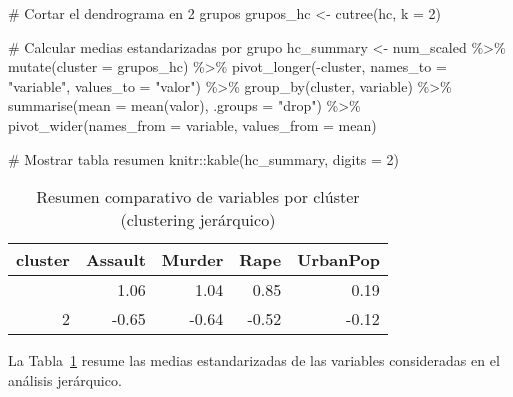 \documentclass[
  spanish,
  11pt,
  a4paper,
  DIV=11,
  numbers=noendperiod]{scrartcl}
\newenvironment{Shaded}{\begin{snugshade}}{\end{snugshade}}
\newcommand{\AttributeTok}[1]{\textcolor[rgb]{0.40,0.45,0.13}{#1}}
\newcommand{\CommentTok}[1]{\textcolor[rgb]{0.37,0.37,0.37}{#1}}
\newcommand{\DecValTok}[1]{\textcolor[rgb]{0.68,0.00,0.00}{#1}}
\newcommand{\FunctionTok}[1]{\textcolor[rgb]{0.28,0.35,0.67}{#1}}
\newcommand{\NormalTok}[1]{\textcolor[rgb]{0.00,0.23,0.31}{#1}}
\newcommand{\OtherTok}[1]{\textcolor[rgb]{0.00,0.23,0.31}{#1}}
\newcommand{\SpecialCharTok}[1]{\textcolor[rgb]{0.37,0.37,0.37}{#1}}
\newcommand{\StringTok}[1]{\textcolor[rgb]{0.13,0.47,0.30}{#1}}
\begin{document}
\begin{Shaded}
\begin{Highlighting}[numbers=left,,]
\CommentTok{\# Cortar el dendrograma en 2 grupos}
\NormalTok{grupos\_hc }\OtherTok{\textless{}{-}} \FunctionTok{cutree}\NormalTok{(hc, }\AttributeTok{k =} \DecValTok{2}\NormalTok{)}

\CommentTok{\# Calcular medias estandarizadas por grupo}
\NormalTok{hc\_summary }\OtherTok{\textless{}{-}}\NormalTok{ num\_scaled }\SpecialCharTok{\%\textgreater{}\%}
  \FunctionTok{mutate}\NormalTok{(}\AttributeTok{cluster =}\NormalTok{ grupos\_hc) }\SpecialCharTok{\%\textgreater{}\%}
  \FunctionTok{pivot\_longer}\NormalTok{(}\SpecialCharTok{{-}}\NormalTok{cluster, }\AttributeTok{names\_to =} \StringTok{"variable"}\NormalTok{, }\AttributeTok{values\_to =} \StringTok{"valor"}\NormalTok{) }\SpecialCharTok{\%\textgreater{}\%}
  \FunctionTok{group\_by}\NormalTok{(cluster, variable) }\SpecialCharTok{\%\textgreater{}\%}
  \FunctionTok{summarise}\NormalTok{(}\AttributeTok{mean =} \FunctionTok{mean}\NormalTok{(valor), }\AttributeTok{.groups =} \StringTok{"drop"}\NormalTok{) }\SpecialCharTok{\%\textgreater{}\%}
  \FunctionTok{pivot\_wider}\NormalTok{(}\AttributeTok{names\_from =}\NormalTok{ variable, }\AttributeTok{values\_from =}\NormalTok{ mean)}

\CommentTok{\# Mostrar tabla resumen}
\NormalTok{knitr}\SpecialCharTok{::}\FunctionTok{kable}\NormalTok{(hc\_summary, }\AttributeTok{digits =} \DecValTok{2}\NormalTok{)}
\end{Highlighting}
\end{Shaded}

\begin{longtable}[]{@{}rrrrr@{}}

\caption{\label{tbl-hc-summary}Resumen comparativo de variables por
clúster (clustering jerárquico)}

\tabularnewline

\toprule\noalign{}
cluster & Assault & Murder & Rape & UrbanPop \\
\midrule\noalign{}
\endhead
\bottomrule\noalign{}
\endlastfoot
1 & 1.06 & 1.04 & 0.85 & 0.19 \\
2 & -0.65 & -0.64 & -0.52 & -0.12 \\

\end{longtable}

La Tabla~\ref{tbl-hc-summary} resume las medias estandarizadas de las
variables consideradas en el análisis jerárquico.
\end{document}
